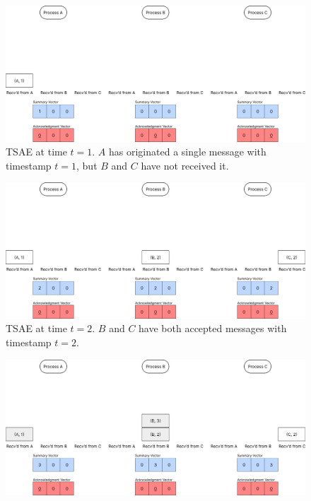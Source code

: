 \documentclass[]             %
{NASA}                       %
\theoremstyle{definition}
\begin{document}
\newpage
\begin{landscape}
  \begin{figure}%
  \end{figure}
  \begin{figure}[h]
    \centering
    \includegraphics[width=1.4\textwidth]{images/tsae/TSAE1.png}
    \caption{TSAE at time $t=1$. $A$ has originated a single message with timestamp $t=1$, but $B$ and $C$ have not received it.}
    \label{fig:tsae1}
  \end{figure}
  \begin{figure}[h]
    \centering
    \includegraphics[width=1.4\textwidth]{images/tsae/TSAE2.png}
    \caption{TSAE at time $t=2$. $B$ and $C$ have both accepted messages with timestamp $t=2$.}
    \label{fig:tsae2}
  \end{figure}
  \begin{figure}[h]
    \centering
    \includegraphics[width=1.4\textwidth]{images/tsae/TSAE3.png}

\end{figure}
\end{landscape}
\end{document}
